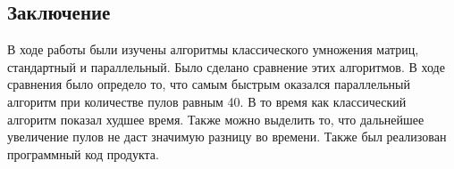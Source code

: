\documentclass[a4paper, 12pt]{article}
\begin{document}
\begin{flushleft}
	\newpage
	\section*{Заключение}
	\hspace*{5mm} В ходе работы были изучены алгоритмы классического умножения матриц, стандартный и параллельный. Было сделано сравнение этих алгоритмов. В ходе сравнения было определо то, что самым быстрым оказался параллельный алгоритм при количестве пулов равным 40. В то время как классический алгоритм показал худшее время. Также можно выделить то, что дальнейшее увеличение пулов не даст значимую разницу во времени. Также был реализован программный код продукта.  
\end{flushleft}

\clearpage
\newpage

\printbibliography
\end{document}
